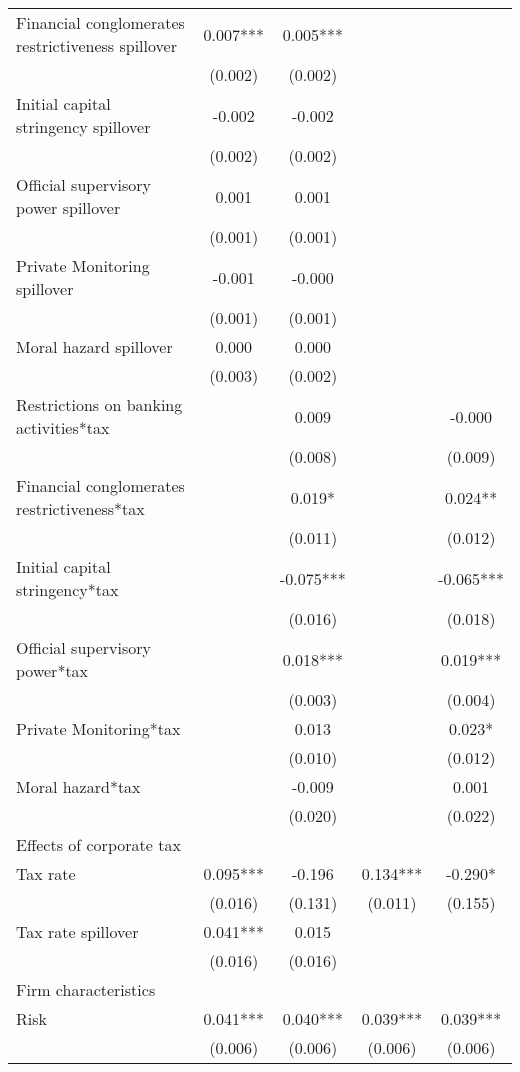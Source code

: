 \begin{longtable}{lcccc}
\quad Financial conglomerates restrictiveness spillover & 0.007*** & 0.005*** &  &  \\
 & (0.002) & (0.002) &  &  \\
\quad Initial capital stringency spillover & -0.002 & -0.002 &  &  \\
 & (0.002) & (0.002) &  &  \\
\quad Official supervisory power spillover & 0.001 & 0.001 &  &  \\
 & (0.001) & (0.001) &  &  \\
\quad Private Monitoring spillover & -0.001 & -0.000 &  &  \\
 & (0.001) & (0.001) &  &  \\
\quad Moral hazard spillover & 0.000 & 0.000 &  &  \\
 & (0.003) & (0.002) &  &  \\
\quad Restrictions on banking activities*tax &  & 0.009 &  & -0.000 \\
 &  & (0.008) &  & (0.009) \\
\quad Financial conglomerates restrictiveness*tax &  & 0.019* &  & 0.024** \\
 &  & (0.011) &  & (0.012) \\
\quad Initial capital stringency*tax &  & -0.075*** &  & -0.065*** \\
 &  & (0.016) &  & (0.018) \\
\quad Official supervisory power*tax &  & 0.018*** &  & 0.019*** \\
 &  & (0.003) &  & (0.004) \\
\quad Private Monitoring*tax &  & 0.013 &  & 0.023* \\
 &  & (0.010) &  & (0.012) \\
\quad Moral hazard*tax &  & -0.009 &  & 0.001 \\
 &  & (0.020) &  & (0.022) \\
     Effects of corporate tax &  &  &  \\
\quad Tax rate & 0.095*** & -0.196 & 0.134*** & -0.290* \\
 & (0.016) & (0.131) & (0.011) & (0.155) \\
\quad Tax rate spillover & 0.041*** & 0.015 &  &  \\
 & (0.016) & (0.016) &  &  \\
      Firm characteristics &  &  &  \\
\quad Risk & 0.041*** & 0.040*** & 0.039*** & 0.039*** \\
 & (0.006) & (0.006) & (0.006) & (0.006) \\

\end{longtable}
